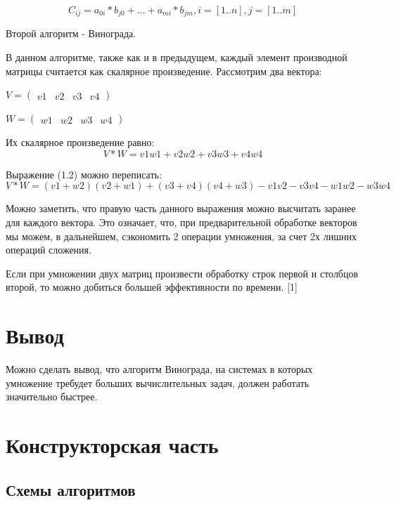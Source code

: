 \documentclass[12pt]{report}
\begin{document}
\begin{equation}
C_{ij} = a_{0i} * b_{j0} + ... + a_{mi} * b_{jm},  i = [1..n], j = [1..m]
\end{equation}

Второй алгоритм - Винограда.

В данном алгоритме, также как и в предыдущем, каждый элемент производной матрицы считается как скалярное произведение.
Рассмотрим два вектора:
\begin{center}
{$
V = 
\begin{pmatrix}
  v1 & v2 & v3 & v4
\end{pmatrix}
$}

{$
W = 
\begin{pmatrix}
  w1 & w2 & w3 & w4
\end{pmatrix}
$}
\end{center}

Их скалярное произведение равно:
\begin{equation}
V*W = v1w1 + v2w2 + v3w3 + v4w4
\end{equation}

Выражение (1.2) можно переписать:
\begin{equation}
V*W = (v1 + w2)(v2 + w1) + (v3 + v4)(v4 + w3) - v1v2 - v3v4 - w1w2 - w3w4
\end{equation}

Можно заметить, что правую часть данного выражения можно высчитать заранее для каждого вектора.
Это означает, что, при предварительной обработке векторов мы можем, в дальнейшем, сэкономить 2 операции умножения, за счет 2х лишних операций сложения.

Если при умножении двух матриц произвести обработку строк первой и столбцов второй, то можно добиться большей эффективности по времени. [1]

\chapter*{Вывод}

	Можно сделать вывод, что алгоритм Винограда, на системах в которых умножение требудет больших вычислительных задач, должен работать значительно быстрее.

\chapter{Конструкторская часть}
\section{Схемы алгоритмов}
\end{document}
